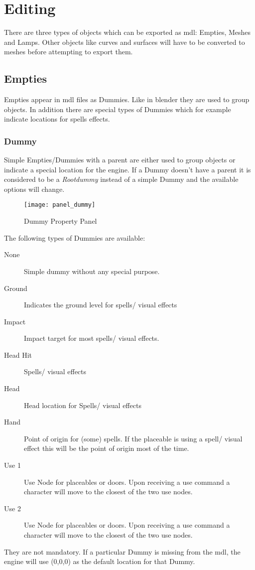 \section{Editing}
There are three types of objects which can be exported as mdl: Empties,
Meshes and Lamps. Other objects like curves and surfaces will have to be
converted to meshes before attempting to export them.

\subsection{Empties}
Empties appear in mdl files as Dummies. Like in blender they are used to group
objects. In addition there are special types of Dummies which for
example indicate locations for spells effects.

\subsubsection{Dummy}
Simple Empties/Dummies with a parent are either used to group objects or
indicate a special location for the engine. If a Dummy doesn't have a
parent it is considered to be a {\textit{Rootdummy}} instead of a simple Dummy
and the available options will change.

\begin{figure}
  \centering
  \texttt{[image: panel\_dummy]}
  \caption[panel dummy]{Dummy Property Panel}
  \label{fig:panel_dummy}
\end{figure}

The following types of Dummies are available:
\begin{description}
    \item[None] Simple dummy without any special purpose.
    \item[Ground] Indicates the ground level for spells/ visual effects
    \item[Impact] Impact target for most spells/ visual effects.
    \item[Head Hit] Spells/ visual effects
    \item[Head] Head location for Spells/ visual effects
    \item[Hand] Point of origin for (some) spells. If the placeable is using a spell/ visual effect this will be the point of origin most of the time.
    \item[Use 1] Use Node for placeables or doors. Upon receiving a use command a character will move to the closest of the two use nodes.
    \item[Use 2] Use Node for placeables or doors. Upon receiving a use command a character will move to the closest of the two use nodes.
\end{description}
They are not mandatory. If a particular Dummy is missing from the mdl, the
engine will use (0,0,0) as the default location for that Dummy.

